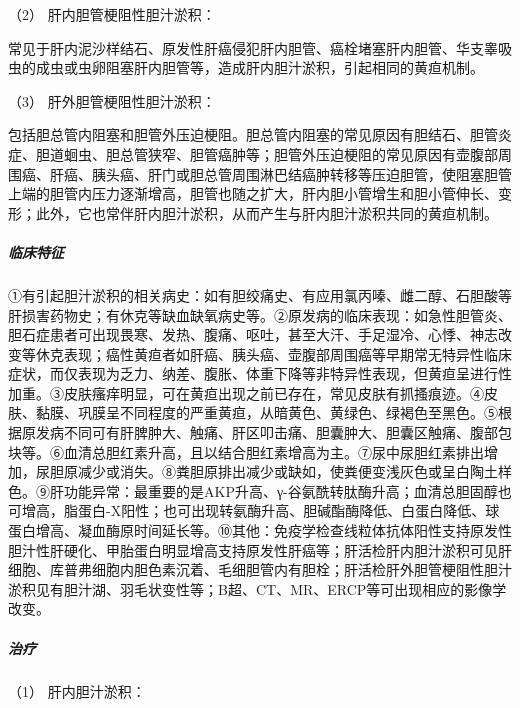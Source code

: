 \hypertarget{text00039.htmlux5cux23CHP1-16-4-4-1-2}{}
（2） 肝内胆管梗阻性胆汁淤积：

常见于肝内泥沙样结石、原发性肝癌侵犯肝内胆管、癌栓堵塞肝内胆管、华支睾吸虫的成虫或虫卵阻塞肝内胆管等，造成肝内胆汁淤积，引起相同的黄疸机制。

\hypertarget{text00039.htmlux5cux23CHP1-16-4-4-1-3}{}
（3） 肝外胆管梗阻性胆汁淤积：

包括胆总管内阻塞和胆管外压迫梗阻。胆总管内阻塞的常见原因有胆结石、胆管炎症、胆道蛔虫、胆总管狭窄、胆管癌肿等；胆管外压迫梗阻的常见原因有壶腹部周围癌、肝癌、胰头癌、肝门或胆总管周围淋巴结癌肿转移等压迫胆管，使阻塞胆管上端的胆管内压力逐渐增高，胆管也随之扩大，肝内胆小管增生和胆小管伸长、变形；此外，它也常伴肝内胆汁淤积，从而产生与肝内胆汁淤积共同的黄疸机制。

\subparagraph{临床特征}

①有引起胆汁淤积的相关病史：如有胆绞痛史、有应用氯丙嗪、雌二醇、石胆酸等肝损害药物史；有休克等缺血缺氧病史等。②原发病的临床表现：如急性胆管炎、胆石症患者可出现畏寒、发热、腹痛、呕吐，甚至大汗、手足湿冷、心悸、神志改变等休克表现；癌性黄疸者如肝癌、胰头癌、壶腹部周围癌等早期常无特异性临床症状，而仅表现为乏力、纳差、腹胀、体重下降等非特异性表现，但黄疸呈进行性加重。③皮肤瘙痒明显，可在黄疸出现之前已存在，常见皮肤有抓搔痕迹。④皮肤、黏膜、巩膜呈不同程度的严重黄疸，从暗黄色、黄绿色、绿褐色至黑色。⑤根据原发病不同可有肝脾肿大、触痛、肝区叩击痛、胆囊肿大、胆囊区触痛、腹部包块等。⑥血清总胆红素升高，且以结合胆红素增高为主。⑦尿中尿胆红素排出增加，尿胆原减少或消失。⑧粪胆原排出减少或缺如，使粪便变浅灰色或呈白陶土样色。⑨肝功能异常：最重要的是AKP升高、γ-谷氨酰转肽酶升高；血清总胆固醇也可增高，脂蛋白-X阳性；也可出现转氨酶升高、胆碱酯酶降低、白蛋白降低、球蛋白增高、凝血酶原时间延长等。⑩其他：免疫学检查线粒体抗体阳性支持原发性胆汁性肝硬化、甲胎蛋白明显增高支持原发性肝癌等；肝活检肝内胆汁淤积可见肝细胞、库普弗细胞内胆色素沉着、毛细胆管内有胆栓；肝活检肝外胆管梗阻性胆汁淤积见有胆汁湖、羽毛状变性等；B超、CT、MR、ERCP等可出现相应的影像学改变。

\subparagraph{治疗}

\hypertarget{text00039.htmlux5cux23CHP1-16-4-4-3-1}{}
（1） 肝内胆汁淤积：


